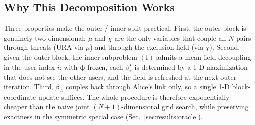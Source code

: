\subsection{Why This Decomposition Works}

Three properties make the outer / inner split practical. First, the outer block is genuinely two-dimensional: $\mu$ and $\chi$ are the only variables that couple all $N$ pairs through threats (URA via $\mu$) and through the exclusion field (via $\chi$). Second, given the outer block, the inner subproblem $(\mathrm{I})$ admits a mean-field decoupling in the user index $i$: with $\boldsymbol{\phi}$ frozen, each $\beta_i^\star$ is determined by a 1-D maximization that does not see the other users, and the field is refreshed at the next outer iteration. Third, $\beta_A$ couples back through Alice's link only, so a single 1-D block-coordinate update suffices. The whole procedure is therefore exponentially cheaper than the naive joint $(N{+}1)$-dimensional grid search, while preserving exactness in the symmetric special case (Sec.~\ref{sec:results:oracle}).
